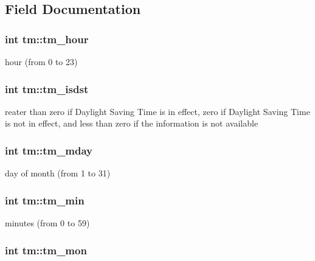 \subsection{Field Documentation}
\hypertarget{structtm_a3e7ca4e37f1abcaf56b8a916c38eb9fe}{
\subsubsection[{tm\_\-hour}]{\setlength{\rightskip}{0pt plus 5cm}int {\bf tm::tm\_\-hour}}}
\label{structtm_a3e7ca4e37f1abcaf56b8a916c38eb9fe}
hour (from 0 to 23) \hypertarget{structtm_a5645ca0580c8ab2c24f6c2965d9c9f9c}{
\subsubsection[{tm\_\-isdst}]{\setlength{\rightskip}{0pt plus 5cm}int {\bf tm::tm\_\-isdst}}}
\label{structtm_a5645ca0580c8ab2c24f6c2965d9c9f9c}
reater than zero if Daylight Saving Time is in effect, zero if Daylight Saving Time is not in effect, and less than zero if the information is not available \hypertarget{structtm_ab8d8904bad43b0c8b96e61941c5b5310}{
\subsubsection[{tm\_\-mday}]{\setlength{\rightskip}{0pt plus 5cm}int {\bf tm::tm\_\-mday}}}
\label{structtm_ab8d8904bad43b0c8b96e61941c5b5310}
day of month (from 1 to 31) \hypertarget{structtm_af414eb7c86cc3099595211eee4d4211b}{
\subsubsection[{tm\_\-min}]{\setlength{\rightskip}{0pt plus 5cm}int {\bf tm::tm\_\-min}}}
\label{structtm_af414eb7c86cc3099595211eee4d4211b}
minutes (from 0 to 59) \hypertarget{structtm_a112ac36fa2f593777138a417cf031e17}{
\subsubsection[{tm\_\-mon}]{\setlength{\rightskip}{0pt plus 5cm}int {\bf tm::tm\_\-mon}}}
\label{structtm_a112ac36fa2f593777138a417cf031e17}
